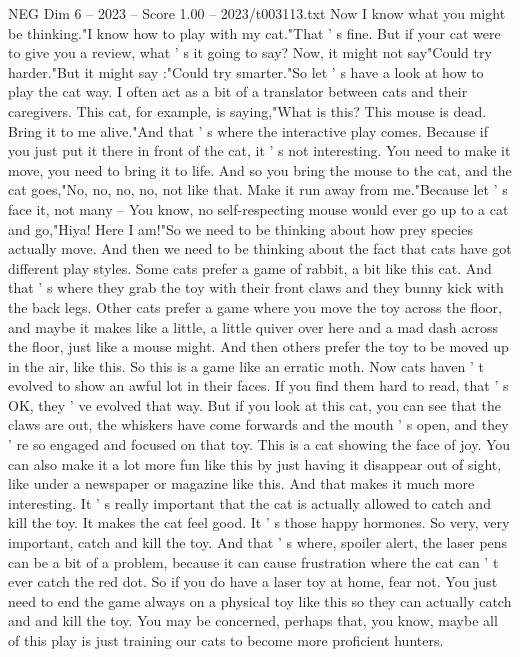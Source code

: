 \begin{textsample}{NEG Dim 6 – 2023 – Score 1.00 – 2023/t003113.txt}
Now I know what you might be thinking."I know how to play with my cat."That ' s fine.
But if your cat were to give you a review, what ' s it going to say?
Now, it might not say"Could try harder."But it might say :"Could try smarter."So let ' s have a look at how to play the cat way.
I often act as a bit of a translator between cats and their caregivers.
This cat, for example, is saying,"What is this?
This mouse is dead.
Bring it to me alive."And that ' s where the interactive play comes.
Because if you just put it there in front of the cat, it ' s not interesting.
You need to make it move, you need to bring it to life.
And so you bring the mouse to the cat, and the cat goes,"No, no, no, no, not like that.
Make it run away from me."Because let ' s face it, not many -- You know, no self-respecting mouse would ever go up to a cat and go,"Hiya!
Here I am!"So we need to be thinking about how prey species actually move.
And then we need to be thinking about the fact that cats have got different play styles.
Some cats prefer a game of rabbit, a bit like this cat.
And that ' s where they grab the toy with their front claws and they bunny kick with the back legs.
Other cats prefer a game where you move the toy across the floor, and maybe it makes like a little, a little quiver over here and a mad dash across the floor, just like a mouse might.
And then others prefer the toy to be moved up in the air, like this.
So this is a game like an erratic moth.
Now cats haven ' t evolved to show an awful lot in their faces.
If you find them hard to read, that ' s OK, they ' ve evolved that way.
But if you look at this cat, you can see that the claws are out, the whiskers have come forwards and the mouth ' s open, and they ' re so engaged and focused on that toy.
This is a cat showing the face of joy.
You can also make it a lot more fun like this by just having it disappear out of sight, like under a newspaper or magazine like this.
And that makes it much more interesting.
It ' s really important that the cat is actually allowed to catch and kill the toy.
It makes the cat feel good.
It ' s those happy hormones.
So very, very important, catch and kill the toy.
And that ' s where, spoiler alert, the laser pens can be a bit of a problem, because it can cause frustration where the cat can ' t ever catch the red dot.
So if you do have a laser toy at home, fear not.
You just need to end the game always on a physical toy like this so they can actually catch and and kill the toy.
You may be concerned, perhaps that, you know, maybe all of this play is just training our cats to become more proficient hunters.

\end{textsample}
